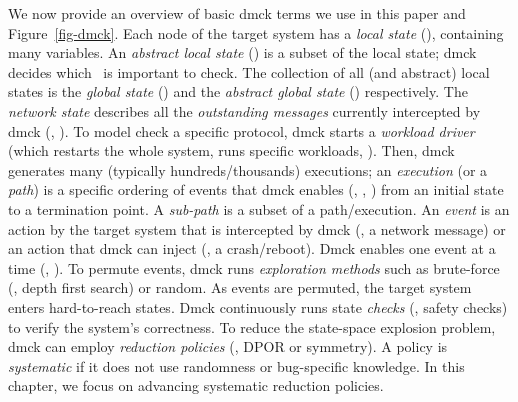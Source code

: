 We now provide an overview of basic dmck terms we use in this paper
and Figure~\ref{fig-dmck}.
%
Each node of the target system has a {\em local state} (\ls),
containing many variables.  An {\em abstract local state} (\als) is a
subset of the local state; dmck decides which \als\ is important to
check.
%
The collection of all (and abstract) local states is the {\em global
  state} (\gs) and the {\em abstract global state} (\ags)
respectively.  
%
The {\em network state} describes all the {\em outstanding messages}
currently intercepted by dmck (\eg, ).
%
To model check a specific protocol, dmck starts a {\em workload
  driver} (which restarts the whole system, runs specific workloads,
\etc).  Then, dmck generates many (typically hundreds/thousands)
executions; an {\em execution} (or a {\em path}) is a specific
ordering of events that dmck enables (\eg, , ) from
an initial state to a termination point.
%
A {\em sub-path} is a subset of a path/execution.
%
An {\em event} is an action by the target system that is intercepted
by dmck (\eg, a network message) or an action that dmck can inject
(\eg, a crash/reboot).
%
Dmck enables one event at a time (\eg, ).
%
To permute events, dmck runs {\em exploration methods} such as
brute-force (\eg, depth first search) or random.  
%
%
As events are permuted, the target system enters hard-to-reach
states.  Dmck continuously runs state {\em checks} (\eg, safety 
checks) to verify the system's correctness.
%
To reduce the state-space explosion problem, dmck can employ {\em
  reduction policies} (\eg, DPOR or symmetry).  A policy is {\em
  systematic} if it does not use randomness or bug-specific knowledge.
%
In this chapter, we focus on advancing systematic reduction policies.


